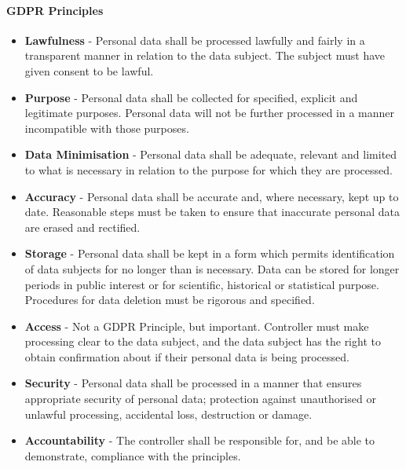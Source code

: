 \paragraph{GDPR Principles}
\begin{itemize}
	\item \textbf{Lawfulness} - Personal data shall be processed lawfully and fairly in a transparent manner in relation to the data subject. The subject must have given consent to be lawful.
	\item \textbf{Purpose} - Personal data shall be collected for specified, explicit and legitimate purposes. Personal data will not be further processed in a manner incompatible with those purposes.
	\item \textbf{Data Minimisation} - Personal data shall be adequate, relevant and limited to what is necessary in relation to the purpose for which they are processed.
	\item \textbf{Accuracy} - Personal data shall be accurate and, where necessary, kept up to date. Reasonable steps must be taken to ensure that inaccurate personal data are erased and rectified.
	\item \textbf{Storage} - Personal data shall be kept in a form which permits identification of data subjects for no longer than is necessary. Data can be stored for longer periods in public interest or for scientific, historical or statistical purpose. Procedures for data deletion must be rigorous and specified. 
	\item \textbf{Access} - Not a GDPR Principle, but important. Controller must make processing clear to the data subject, and the data subject has the right to obtain confirmation about if their personal data is being processed.
	\item \textbf{Security} - Personal data shall be processed in a manner that ensures appropriate security of personal data; protection against unauthorised or unlawful processing, accidental loss, destruction or damage. 
	\item \textbf{Accountability} - The controller shall be responsible for, and be able to demonstrate, compliance with the principles.
\end{itemize}
